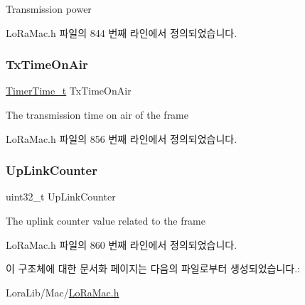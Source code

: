 Transmission power 

Lo\+Ra\+Mac.\+h 파일의 844 번째 라인에서 정의되었습니다.

\mbox{\label{structs_mcps_confirm_aa17a8607485db100d315e74853dd217e}} 
\subsubsection{\texorpdfstring{Tx\+Time\+On\+Air}{TxTimeOnAir}}
{\footnotesize\ttfamily \mbox{\hyperlink{utilities_8h_a4215ca43d3e953099ea758ce428599d0}{Timer\+Time\+\_\+t}} Tx\+Time\+On\+Air}

The transmission time on air of the frame 

Lo\+Ra\+Mac.\+h 파일의 856 번째 라인에서 정의되었습니다.

\mbox{\label{structs_mcps_confirm_ae8c54ca277e4d7295dfd498889e42fdd}} 
\subsubsection{\texorpdfstring{Up\+Link\+Counter}{UpLinkCounter}}
{\footnotesize\ttfamily uint32\+\_\+t Up\+Link\+Counter}

The uplink counter value related to the frame 

Lo\+Ra\+Mac.\+h 파일의 860 번째 라인에서 정의되었습니다.



이 구조체에 대한 문서화 페이지는 다음의 파일로부터 생성되었습니다.\+:\begin{DoxyCompactItemize}
\item 
Lora\+Lib/\+Mac/\mbox{\hyperlink{_lo_ra_mac_8h}{Lo\+Ra\+Mac.\+h}}\end{DoxyCompactItemize}
